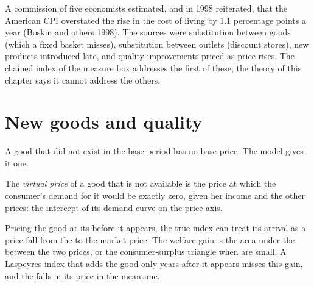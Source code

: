 \begin{record}
A commission of five economists estimated, and in 1998 reiterated, that the
American CPI overstated the rise in the cost of living by 1.1 percentage
points a year (Boskin and others 1998). %
The sources were substitution between goods (which a fixed basket misses),
substitution between outlets (discount stores), new products introduced
late, and quality improvements priced as price rises. The chained index of
the measure box addresses the first of these; the theory of this chapter
says it cannot address the others.
\end{record}

\section{New goods and quality}\label{sec:b1:consumer-welfare:new-goods}

A good that did not exist in the base period has no base price. The model
gives it one.

\begin{definition}\label{def:b1:consumer-welfare:virtual-price}
The \emph{virtual price} of a good that is not available is the price at
which the consumer's demand for it would be exactly zero, given her income
and the other prices: the intercept of its demand curve on the price axis.
\end{definition}

Pricing the good at its  before it appears, the true index can
treat its arrival as a price fall from the  to the market
price. The welfare gain is the area under the  between
the two prices, or the consumer-surplus triangle when  are
small. A Laspeyres index that adds the good only years after it appears
misses this gain, and the falls in its price in the meantime.

